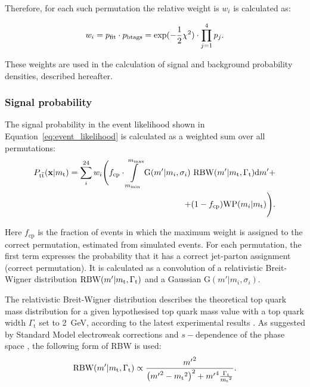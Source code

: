 Therefore, for each such permutation the relative weight is $w_i$ is calculated as:

\begin{equation}
w_i = p_{\rm fit} \cdot p_{\rm btags} = \textrm{exp}(-\frac{1}{2}\chi^2) \cdot \prod_{j=1}^{4} p_{j}.
\label{eq:permutation_weight}
\end{equation}

These weights are used in the calculation of signal and background probability densities, described hereafter.

\subsubsection*{Signal probability}

The \ttbar signal probability in the event likelihood shown in Equation~\ref{eq:event_likelihood} is calculated as a
weighted sum over all permutations:
\begin{equation}
\begin{split}
P_{\mathrm{t}\overline{\mathrm{t}}}(\mathbf{x}|m_\mathrm{t}) = \sum_{i}^{24} w_{i} \Biggl( f_{\textrm{cp}} \cdot
\int\limits^{m_{\textrm{max}}}_{m_{\textrm{min}}} \textrm{G}(m'|m_{i},\sigma_{i}) ~\textrm{RBW}
(m'|m_\mathrm{t},\Gamma_{\textrm{t}}) \textrm{d}m' +  \\  + (1 -
f_{\textrm{cp}})\textrm{WP}(m_{i}|m_\mathrm{t}) \Biggr).
\end{split}
\end{equation}

Here $f_{\textrm{cp}}$ is the fraction of events in which the maximum weight is assigned to the correct permutation,
estimated from simulated \ttbar events. For each permutation, the first term expresses the probability that it has a
correct jet-parton assignment (correct permutation). It is calculated as a convolution of a relativistic Breit-Wigner
distribution $\textrm{RBW}(m'|m_\mathrm{t},\Gamma_{\textrm{t}})$ and a Gaussian $\textrm{G}(m'|m_{i},\sigma_{i})$.

The relativistic Breit-Wigner distribution describes the theoretical top quark mass distribution for a given
hypothesised top quark mass value \mtop with a top quark width $\Gamma_{\textrm{t}}$ set to \SI{2}{\GeV}, according to
the latest experimental results \autocite{top_width_D0}. As suggested by Standard Model electroweak corrections and
$s-$dependence of the phase space \cite{aleph_Z_RBW}, the following form of RBW is used:
\begin{equation}
\textrm{RBW}(m'|m_\mathrm{t},\Gamma_{\textrm{t}}) \propto \frac{{m'}^{2}}{\left({m'}^{2} - {m_\mathrm{t}}^{2}
\right)^{2} + {m'}^{4}\frac{\Gamma_{\textrm{t}}}{{m_\mathrm{t}}^{2}}}.
\end{equation}

